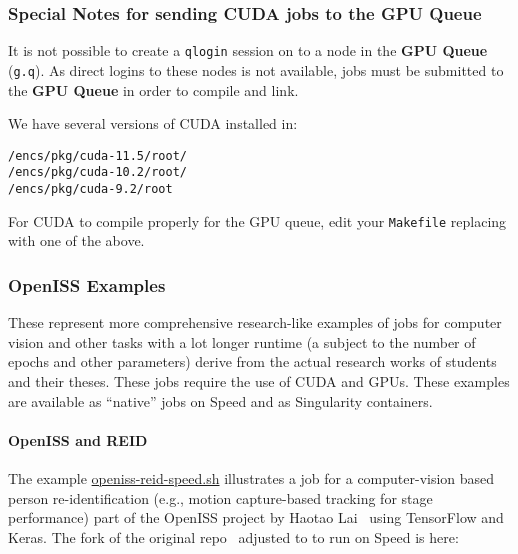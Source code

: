 \subsubsection{Special Notes for sending CUDA jobs to the GPU Queue}

It is not possible to create a \texttt{qlogin} session on to a node in the 
\textbf{GPU Queue} (\texttt{g.q}). As direct logins to these nodes is not 
available, jobs must be submitted to the \textbf{GPU Queue} in order to compile 
and link.

We have several versions of CUDA installed in:
\begin{verbatim}
/encs/pkg/cuda-11.5/root/
/encs/pkg/cuda-10.2/root/
/encs/pkg/cuda-9.2/root
\end{verbatim}

For CUDA to compile properly for the GPU queue, edit your \texttt{Makefile}
replacing  with one of the above.

\subsubsection{OpenISS Examples}
\label{sect:openiss-examples}

These represent more comprehensive research-like examples of
jobs for computer vision and other tasks with a lot longer
runtime (a subject to the number of epochs and other parameters)
derive from the actual research works of students and their
theses.
%
These jobs require the use of CUDA and GPUs.
These examples are available as ``native'' jobs on Speed
and as Singularity containers.

\paragraph{OpenISS and REID}
\label{sect:openiss-reid}

The example
  \href{https://github.com/NAG-DevOps/speed-hpc/blob/master/src/openiss-reid-speed.sh}
  {openiss-reid-speed.sh}
illustrates a job for a computer-vision based person re-identification
(e.g., motion capture-based tracking for stage performance) part of the OpenISS
project by Haotao Lai~\cite{lai-haotao-mcthesis19} using TensorFlow and Keras.
The fork of the original repo~\cite{openiss-reid-tfk} adjusted to to run on Speed is here:

